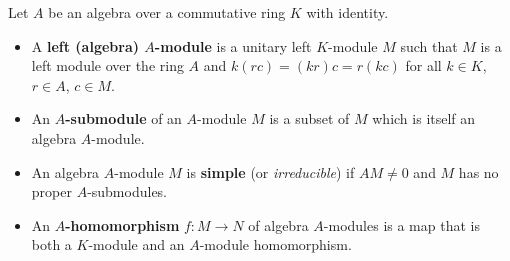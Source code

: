 Let $A$ be an algebra over a commutative ring $K$ with identity.
\begin{itemize}
\item[(i)] A \textbf{left (algebra) $A$-module} is a unitary left $K$-module $M$ such that $M$ is a left module over the ring $A$ and $k(rc) = (kr)c = r(kc)$ for all $k \in K$, $r \in A$, $c \in M$.
\item[(ii)] An \textbf{$A$-submodule} of an $A$-module $M$ is a subset of $M$ which is itself an algebra $A$-module.
\item[(iii)] An algebra $A$-module $M$ is \textbf{simple} (or \textit{irreducible}) if $AM \neq 0$ and $M$ has no proper $A$-submodules.
\item[(iv)] An \textbf{$A$-homomorphism} $f: M \to N$ of algebra $A$-modules is a map that is both a $K$-module and an $A$-module homomorphism.
\end{itemize}

